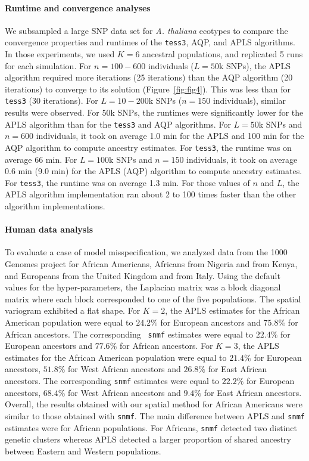 \paragraph{Runtime and convergence analyses} We subsampled a large SNP data set
for {\it A. thaliana} ecotypes to compare the convergence properties and
runtimes of the {\tt tess3}, AQP, and APLS algorithms. In those experiments, we
used $K = 6$ ancestral populations, and replicated 5 runs for each simulation.
For $n = 100-600$ individuals ($L = 50$k SNPs), the APLS algorithm required more
iterations (25 iterations) than the AQP algorithm (20 iterations) to converge to
its solution (Figure~\ref{fig:fig4}). This was less than for {\tt tess3} (30 iterations). For
$L = 10-200$k SNPs ($n = 150$ individuals), similar results were observed. For
$50$k SNPs, the runtimes were significantly lower for the APLS algorithm than
for the {\tt tess3} and AQP algorithms. For $L = 50$k SNPs and $n = 600$
individuals, it took on average 1.0 min for the APLS and 100 min for the AQP
algorithm to compute ancestry estimates. For {\tt tess3}, the runtime was on
average 66 min. For $L = 100$k SNPs and $n = 150$ individuals, it took on
average 0.6 min (9.0 min) for the APLS (AQP) algorithm to compute ancestry
estimates. For {\tt tess3}, the runtime was on average 1.3 min. For those
values of $n$ and $L$, the APLS algorithm implementation ran about 2 to 100
times faster than the other algorithm implementations.
 
\paragraph{Human data analysis} To evaluate a case of model misspecification, we
analyzed data from the 1000 Genomes project for African Americans, Africans from
Nigeria and from Kenya, and Europeans from the United Kingdom and from Italy.
Using the default values for the hyper-parameters, the Laplacian matrix was a
block diagonal matrix where each block corresponded to one of the five
populations. The spatial variogram exhibited a flat shape. For $K = 2$, the APLS
estimates for the African American population were equal to $24.2 \%$ for
European ancestors and $75.8 \%$ for African ancestors. The corresponding {\tt
  snmf} estimates were equal to $22.4 \%$ for European ancestors and $77.6 \%$
for African ancestors. For $K = 3$, the APLS estimates for the African American
population were equal to $21.4 \%$ for European ancestors, $51.8 \%$ for West
African ancestors and $26.8 \%$ for East African ancestors. The corresponding
{\tt snmf} estimates were equal to $22.2 \%$ for European ancestors, $68.4 \%$
for West African ancestors and $9.4 \%$ for East African ancestors. Overall, the
results obtained with our spatial method for African Americans were similar to
those obtained with {\tt snmf}. The main difference between APLS and {\tt snmf}
estimates were for African populations. For Africans, {\tt snmf} detected two
distinct genetic clusters whereas APLS detected a larger proportion of shared
ancestry between Eastern and Western populations.


